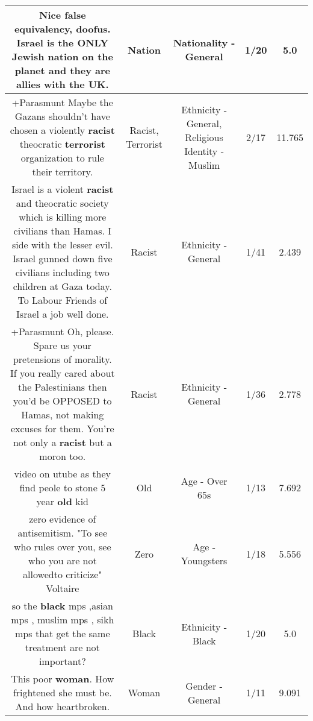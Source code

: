 \documentclass[11pt]{article}
\newlength\mylength
\begin{document}
\begin{center}
\begin{longtable}{|C{.65\mylength}|C{.30\mylength}|C{.12\mylength}|C{.12\mylength}|C{.12\mylength}|}
  \small Nice false equivalency, doofus.  Israel is the ONLY Jewish \textbf{nation} on the planet and they are allies with the UK.\normalsize   & Nation & Nationality - General & 1/20 & 5.0 \\  \hline
  \small +Parasmunt  Maybe the Gazans shouldn't have chosen a violently \textbf{racist} theocratic \textbf{terrorist} organization to rule their territory.\normalsize   & Racist, Terrorist & Ethnicity - General, Religious Identity - Muslim & 2/17 & 11.765 \\  \hline
  \small Israel is a violent \textbf{racist} and theocratic society which is killing more civilians than Hamas. I side with the lesser evil. Israel gunned down five civilians including two children at Gaza today. To Labour Friends of Israel a job well done.\normalsize   & Racist & Ethnicity - General & 1/41 & 2.439 \\  \hline
  \small +Parasmunt  Oh, please.  Spare us your pretensions of morality.  If you really cared about the Palestinians then you'd be OPPOSED to Hamas, not making excuses for them.  You're not only a \textbf{racist} but a moron too.\normalsize   & Racist & Ethnicity - General & 1/36 & 2.778 \\  \hline
  \small video on utube as they find peole to stone 5 year \textbf{old} kid\normalsize   & Old & Age - Over 65s & 1/13 & 7.692 \\  \hline
  \small zero evidence of antisemitism. "To see who rules over you, see who you are not allowedto criticize" Voltaire\normalsize   & Zero & Age - Youngsters & 1/18 & 5.556 \\  \hline
  \small so the \textbf{black} mps ,asian mps , muslim mps , sikh mps that get the same treatment are not important?\normalsize   & Black & Ethnicity - Black & 1/20 & 5.0 \\  \hline
  \small This poor \textbf{woman}.  How frightened she must be.  And how heartbroken.\normalsize   & Woman & Gender - General & 1/11 & 9.091 \\  \hline

\end{longtable}
\end{center}
\end{document}
